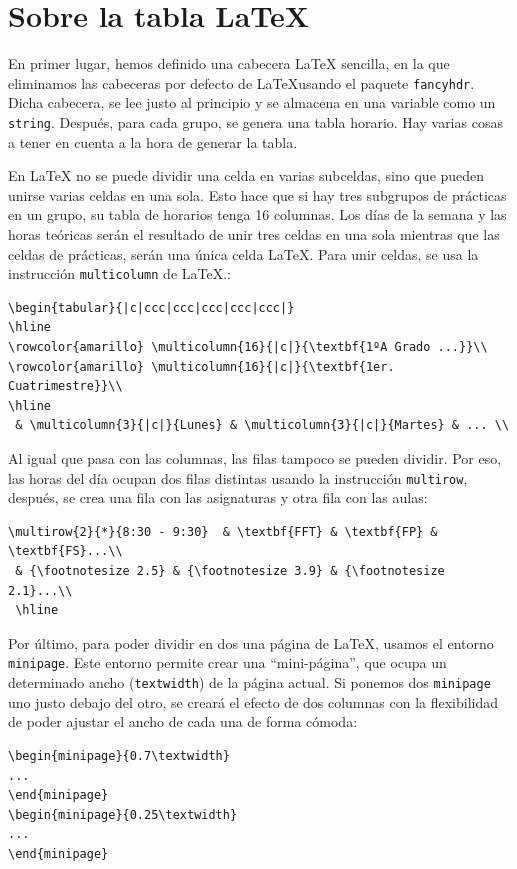 \section{Sobre la tabla \LaTeX}
En primer lugar, hemos definido una cabecera \LaTeX\; sencilla, en la que eliminamos las cabeceras por defecto de \LaTeX usando el paquete \texttt{fancyhdr}. Dicha cabecera, se lee justo al principio y se almacena en una variable como un \texttt{string}. Después, para cada grupo, se genera una tabla horario. Hay varias cosas a tener en cuenta a la hora de generar la tabla.

En \LaTeX\; no se puede dividir una celda en varias subceldas, sino que pueden unirse varias celdas en una sola. Esto hace que si hay tres subgrupos de prácticas en un grupo, su tabla de horarios tenga 16 columnas. Los días de la semana y las horas teóricas serán el resultado de unir tres celdas en una sola mientras que las celdas de prácticas, serán una única celda \LaTeX. Para unir celdas, se usa la instrucción \texttt{multicolumn} de \LaTeX.:

\begin{verbatim}
\begin{tabular}{|c|ccc|ccc|ccc|ccc|ccc|}
\hline
\rowcolor{amarillo} \multicolumn{16}{|c|}{\textbf{1ºA Grado ...}}\\ 
\rowcolor{amarillo} \multicolumn{16}{|c|}{\textbf{1er. Cuatrimestre}}\\ 
\hline 
 & \multicolumn{3}{|c|}{Lunes} & \multicolumn{3}{|c|}{Martes} & ... \\
\end{verbatim}

Al igual que pasa con las columnas, las filas tampoco se pueden dividir. Por eso, las horas del día ocupan dos filas distintas usando la instrucción \texttt{multirow}, después, se crea una fila con las asignaturas y otra fila con las aulas:

\begin{verbatim}
\multirow{2}{*}{8:30 - 9:30}  & \textbf{FFT} & \textbf{FP} & \textbf{FS}...\\ 
 & {\footnotesize 2.5} & {\footnotesize 3.9} & {\footnotesize 2.1}...\\ 
 \hline
\end{verbatim}

Por último, para poder dividir en dos una página de \LaTeX, usamos el entorno \texttt{minipage}. Este entorno permite crear una ``mini-página'', que ocupa un determinado ancho (\texttt{textwidth}) de la página actual. Si ponemos dos \texttt{minipage} uno justo debajo del otro, se creará el efecto de dos columnas con la flexibilidad de poder ajustar el ancho de cada una de forma cómoda:

\begin{verbatim}
\begin{minipage}{0.7\textwidth}
...
\end{minipage}
\begin{minipage}{0.25\textwidth}
...
\end{minipage}
\end{verbatim}

